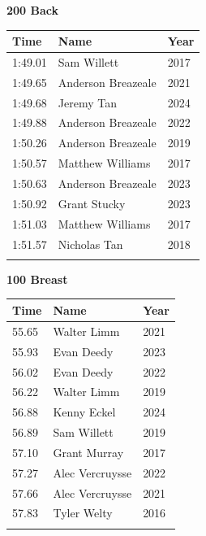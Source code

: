 \hfill
\begin{minipage}[t]{0.48\textwidth}
\centering
\textbf{\textcolor{teamprimary}{200 Back}}\par
\vspace{0.5em}
\centering
\small
\renewcommand{\arraystretch}{1.0}
\setlength{\tabcolsep}{4pt}
\begin{tabular}{@{}p{1.8cm}p{3.0cm}p{1.0cm}@{}}
\toprule
\textbf{Time} & \textbf{Name} & \textbf{Year} \\
\midrule
1:49.01 & Sam Willett & 2017 \\
1:49.65 & Anderson Breazeale & 2021 \\
1:49.68 & Jeremy Tan & 2024 \\
1:49.88 & Anderson Breazeale & 2022 \\
1:50.26 & Anderson Breazeale & 2019 \\
1:50.57 & Matthew Williams & 2017 \\
1:50.63 & Anderson Breazeale & 2023 \\
1:50.92 & Grant Stucky & 2023 \\
1:51.03 & Matthew Williams & 2017 \\
1:51.57 & Nicholas Tan & 2018 \\
\bottomrule
\vspace{0.5em}
\end{tabular}
\end{minipage}
\vspace{1.2em}
\noindent\begin{minipage}[t]{0.48\textwidth}
\centering
\textbf{\textcolor{teamprimary}{100 Breast}}\par
\vspace{0.5em}
\centering
\small
\renewcommand{\arraystretch}{1.0}
\setlength{\tabcolsep}{4pt}
\begin{tabular}{@{}p{1.8cm}p{3.0cm}p{1.0cm}@{}}
\toprule
\textbf{Time} & \textbf{Name} & \textbf{Year} \\
\midrule
55.65 & Walter Limm & 2021 \\
55.93 & Evan Deedy & 2023 \\
56.02 & Evan Deedy & 2022 \\
56.22 & Walter Limm & 2019 \\
56.88 & Kenny Eckel & 2024 \\
56.89 & Sam Willett & 2019 \\
57.10 & Grant Murray & 2017 \\
57.27 & Alec Vercruysse & 2022 \\
57.66 & Alec Vercruysse & 2021 \\
57.83 & Tyler Welty & 2016 \\
\bottomrule
\vspace{0.5em}
\end{tabular}
\end{minipage}
